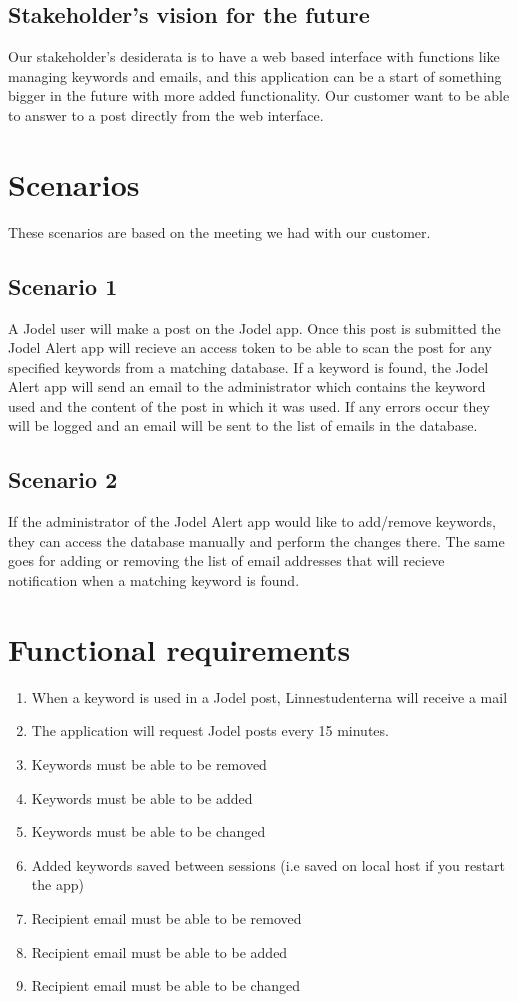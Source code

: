 \documentclass[a4paper,12pt]{article}
\begin{document}
\subsection{Stakeholder's vision for the future}
Our stakeholder's desiderata is to have a web based interface with functions like managing keywords and emails, and this application can be a start of something bigger in the future with more added functionality.
Our customer want to be able to answer to a post directly from the web interface.
\section{Scenarios}
These scenarios are based on the meeting we had with our customer.
\subsection{Scenario 1}
A Jodel user will make a post on the Jodel app. Once this post is submitted the Jodel Alert app will recieve an access token to be able to scan the post for any specified keywords from a matching database. If a keyword is found, the Jodel Alert app will send an email to the administrator which contains the keyword used and the content of the post in which it was used. If any errors occur they will be logged and an email will be sent to the list of emails in the database.
\subsection{Scenario 2}
If the administrator of the Jodel Alert app would like to add/remove keywords, they can access the database manually and perform the changes there. The same goes for adding or removing the list of email addresses that will recieve notification when a matching keyword is found.
\section{Functional requirements}
\begin{enumerate}
	\item When a keyword is used in a Jodel post, Linnestudenterna will receive a mail
	\item The application will request Jodel posts every 15 minutes.
	\item Keywords must be able to be removed
	\item Keywords must be able to be added
	\item Keywords must be able to be changed
	\item Added keywords saved between sessions (i.e saved on local host if you restart the app)
	\item Recipient email must be able to be removed
	\item Recipient email must be able to be added
	\item Recipient email must be able to be changed
\end{enumerate}
\end{document}
